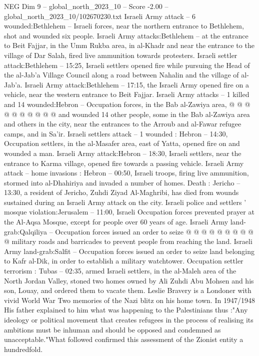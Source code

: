 \begin{textsample}{NEG Dim 9 – global\_north\_2023\_10 – Score -2.00 – global\_north\_2023\_10/102670230.txt}
Israeli Army attack -- 6 wounded:Bethlehem -- Israeli forces, near the northern entrance to Bethlehem, shot and wounded six people.
Israeli Army attacks:Bethlehem -- at the entrance to Beit Fajjar, in the Umm Rukba area, in al-Khadr and near the entrance to the village of Dar Salah, fired live ammunition towards protesters.
Israeli settler attack:Bethlehem -- 15:25, Israeli settlers opened fire while pursuing the Head of the al-Jab'a Village Council along a road between Nahalin and the village of al-Jab'a.
Israeli Army attack:Bethlehem -- 17:15, the Israeli Army opened fire on a vehicle, near the western entrance to Beit Fajjar.
Israeli Army attacks -- 1 killed and 14 wounded:Hebron -- Occupation forces, in the Bab al-Zawiya area, @ @ @ @ @ @ @ @ @ @ and wounded 14 other people, some in the Bab al-Zawiya area and others in the city, near the entrances to the Arroub and al-Fawar refugee camps, and in Sa'ir.
Israeli settlers attack -- 1 wounded : Hebron -- 14:30, Occupation settlers, in the al-Masafer area, east of Yatta, opened fire on and wounded a man.
Israeli Army attack:Hebron -- 18:30, Israeli settlers, near the entrance to Karma village, opened fire towards a passing vehicle.
Israeli Army attack -- home invasions : Hebron -- 00:50, Israeli troops, firing live ammunition, stormed into al-Dhahiriya and invaded a number of homes.
Death : Jericho -- 13:30, a resident of Jericho, Zuhdi Ziyad Al-Maghribi, has died from wounds sustained during an Israeli Army attack on the city.
Israeli police and settlers ' mosque violation:Jerusalem -- 11:00, Israeli Occupation forces prevented prayer at the Al-Aqsa Mosque, except for people over 60 years of age.
Israeli Army land-grab:Qalqiliya -- Occupation forces issued an order to seize @ @ @ @ @ @ @ @ @ @ military roads and barricades to prevent people from reaching the land.
Israeli Army land-grab:Salfit -- Occupation forces issued an order to seize land belonging to Kafr al-Dik, in order to establish a military watchtower.
Occupation settler terrorism : Tubas -- 02:35, armed Israeli settlers, in the al-Maleh area of the North Jordan Valley, stoned two homes owned by Ali Zuhdi Abu Mohsen and his son, Louay, and ordered them to vacate them.
Leslie Bravery is a Londoner with vivid World War Two memories of the Nazi blitz on his home town.
In 1947/1948 His father explained to him what was happening to the Palestinians thus :"Any ideology or political movement that creates refugees in the process of realising its ambitions must be inhuman and should be opposed and condemned as unacceptable."What followed confirmed this assessment of the Zionist entity a hundredfold.

\end{textsample}
